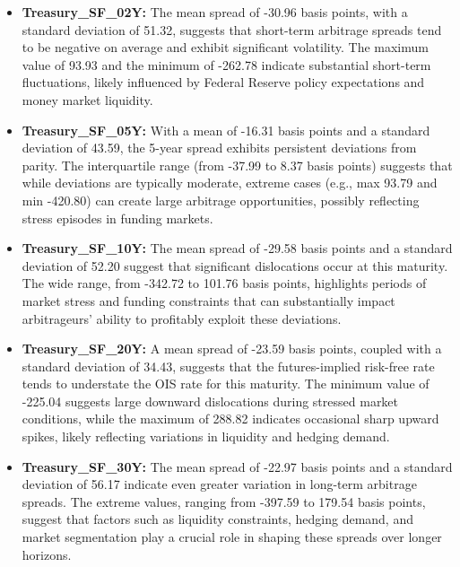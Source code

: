 \documentclass{article}
\begin{document}
\begin{itemize}
\item \textbf{Treasury\_SF\_02Y:} The mean spread of -30.96 basis points, with a standard deviation of 51.32, suggests that short-term arbitrage spreads tend to be negative on average and exhibit significant volatility. The maximum value of 93.93 and the minimum of -262.78 indicate substantial short-term fluctuations, likely influenced by Federal Reserve policy expectations and money market liquidity.

\item \textbf{Treasury\_SF\_05Y:} With a mean of -16.31 basis points and a standard deviation of 43.59, the 5-year spread exhibits persistent deviations from parity. The interquartile range (from -37.99 to 8.37 basis points) suggests that while deviations are typically moderate, extreme cases (e.g., max 93.79 and min -420.80) can create large arbitrage opportunities, possibly reflecting stress episodes in funding markets.  

\item \textbf{Treasury\_SF\_10Y:} The mean spread of -29.58 basis points and a standard deviation of 52.20 suggest that significant dislocations occur at this maturity. The wide range, from -342.72 to 101.76 basis points, highlights periods of market stress and funding constraints that can substantially impact arbitrageurs' ability to profitably exploit these deviations.  

\item \textbf{Treasury\_SF\_20Y:} A mean spread of -23.59 basis points, coupled with a standard deviation of 34.43, suggests that the futures-implied risk-free rate tends to understate the OIS rate for this maturity. The minimum value of -225.04 suggests large downward dislocations during stressed market conditions, while the maximum of 288.82 indicates occasional sharp upward spikes, likely reflecting variations in liquidity and hedging demand.  

\item \textbf{Treasury\_SF\_30Y:} The mean spread of -22.97 basis points and a standard deviation of 56.17 indicate even greater variation in long-term arbitrage spreads. The extreme values, ranging from -397.59 to 179.54 basis points, suggest that factors such as liquidity constraints, hedging demand, and market segmentation play a crucial role in shaping these spreads over longer horizons.  

\end{itemize}
\end{document}
